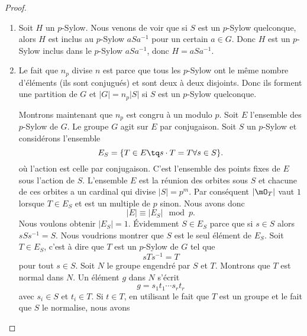\begin{proof}
\begin{enumerate}
        \item

            Soit \( H\) un $p$-Sylow. Nous venons de voir que si \( S\) est un $p$-Sylow quelconque, alors \( H\) est inclus au $p$-Sylow \( aSa^{-1}\) pour un certain \( a\in G\). Donc \( H\) est un $p$-Sylow inclus dans le $p$-Sylow \( aSa^{-1}\), donc \( H=aSa^{-1}\).

        \item

            Le fait que \( n_p\) divise \( n\) est parce que tous les $p$-Sylow ont le même nombre d'éléments (ils sont conjugués) et sont deux à deux disjoints. Donc ils forment une partition de \( G\) et \( | G |=n_p| S |\) si \( S\) est un $p$-Sylow quelconque.
            
            Montrons maintenant que \( n_p\) est congru à un modulo \( p\). Soit \( E\) l'ensemble des $p$-Sylow de \( G\). Le groupe \( G\) agit sur \( E\) par conjugaison. Soit \( S\) un $p$-Sylow et considérons l'ensemble
            \begin{equation}
                E_S=\{ T\in E\tq s\cdot T=T\forall s\in S \}.
            \end{equation}
            où l'action est celle par conjugaison. C'est l'ensemble des points fixes de \( E\) sous l'action de \( S\). L'ensemble \( E\) est la réunion des orbites sous \( S\) et chacune de ces orbites a un cardinal qui divise \( | S |=p^m\). Par conséquent \( | \mO_T |\) vaut \( 1\) lorsque \( T\in E_S\) et est un multiple de \( p\) sinon. Nous avons donc
            \begin{equation}
                | E |\equiv | E_S |\mod p.
            \end{equation}
            Nous voulons obtenir \( | E_S |=1\). Évidemment \( S\in E_S\) parce que si \( s\in S\) alors \( sSs^{-1}=S\). Nous voudrions montrer que \( S\) est le seul élément de \( E_S\). Soit \( T\in E_S\), c'est à dire que \( T\) est un $p$-Sylow de \( G\) tel que
            \begin{equation}
                sTs^{-1}=T
            \end{equation}
            pour tout \( s\in S\). Soit \( N\) le groupe engendré par \( S\) et \( T\). Montrons que \( T\) est normal dans \( N\). Un élément \( g\) dans \( N\) s'écrit
            \begin{equation}
                g=s_1t_1\cdots s_rt_r
            \end{equation}
            avec \( s_i\in S\) et \( t_i\in T\). Si \( t\in T\), en utilisant le fait que \( T\) est un groupe et le fait que \( S\) le normalise, nous avons

\end{enumerate}
\end{proof}
